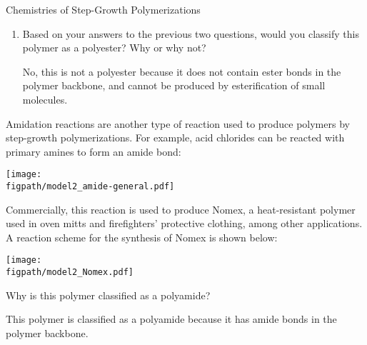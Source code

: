 \begin{activity}{Chemistries of Step-Growth Polymerizations}
\begin{ctqs}
\begin{enumerate}
				\begin{solution}[2in]
					No.  This polymer (poly(methyl acrylate)) contains ester bonds, but they are only in the sidechains, not the backbone.  But when we produce a polymer from esterification reactions of small molecules, the ester bonds end up in the polymer backbone.
					
					Put another way, the backbone in this polymer only contains carbon-carbon bonds, which cannot be formed by esterification reactions.
				\end{solution}
			
			\item Based on your answers to the previous two questions, would you classify this polymer as a polyester?  Why or why not?
			
				\begin{solution}[2in]
					No, this is not a polyester because it does not contain ester bonds in the polymer backbone, and cannot be produced by esterification of small molecules.
				\end{solution}
			
		\end{enumerate}
		
\end{ctqs}
	

\clearpage
\begin{model}
\label{\labelbase:mdl:polyamide}

Amidation reactions are another type of reaction used to produce polymers by step-growth polymerizations.
For example, acid chlorides can be reacted with primary amines to form an amide bond:
	
	\centerline{\texttt{[image: \\figpath/model2\_amide-general.pdf]}}

Commercially, this reaction is used to produce Nomex, a heat-resistant polymer used in oven mitts and firefighters' protective clothing, among other applications.
A reaction scheme for the synthesis of Nomex is shown below:
	
	\centerline{\texttt{[image: \\figpath/model2\_Nomex.pdf]}}

\end{model}

\begin{ctqs}
		\question Why is this polymer classified as a polyamide?
			
				\begin{solution}[1.5in]
					This polymer is classified as a polyamide because it has amide bonds in the polymer backbone.
				\end{solution}
		

\end{ctqs}
\end{activity}
